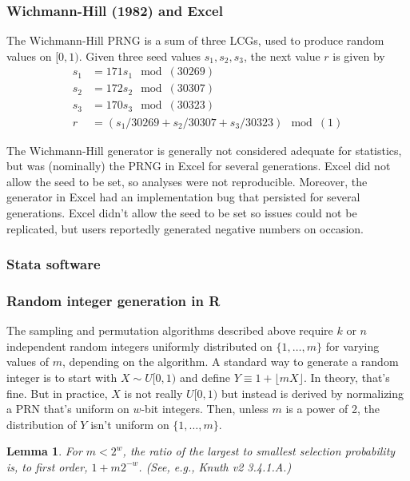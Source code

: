 \documentclass[12pt]{article}
\newtheorem{lemma}[theorem]{Lemma}
\newcommand{\todo}[1]{{\color{red}{TO DO: \sc #1}}}
\begin{document}
\subsubsection{Wichmann-Hill (1982) \todo{cite} and Excel}
The Wichmann-Hill PRNG is a sum of three LCGs, used to produce random values on $[0, 1)$.
Given three seed values $s_1, s_2, s_3$, the next value $r$ is given by
\begin{align*}
s_1 &= 171 s_1\mod(30269) \\
s_2 &= 172 s_2 \mod(30307) \\
s_3 &= 170 s_3 \mod(30323) \\
r &= (s_1/30269 + s_2/30307 + s_3/30323) \mod(1)
\end{align*}

The Wichmann-Hill generator is generally not considered adequate for statistics, but was (nominally) the PRNG in Excel for several generations. 
Excel did not allow the seed to be set, so analyses were not reproducible.
Moreover, the generator in Excel had an implementation bug that persisted for several generations.
Excel didn't allow the seed to be set so issues could not be replicated, but users reportedly generated negative numbers on occasion.
\todo{cite McCullough, B.D., 2008. Microsoft Excel?s ?Not The Wichmann?Hill? random number generators}

\subsubsection{Stata software}
\todo{ summarize results from Ozier: "Perils of Simulation..."}

\subsubsection{Random integer generation in R}
The sampling and permutation algorithms described above require $k$ or $n$ independent random integers
uniformly distributed on $\{1, \dots, m\}$ for varying values of $m$, depending on the algorithm.
A standard way to generate a random integer is to start with $X \sim U[0,1)$ and define $Y \equiv 1 + \lfloor mX \rfloor$. 
In theory, that's fine. 
But in practice, $X$ is not really $U[0,1)$ but instead is derived by normalizing a PRN that's uniform on $w$-bit integers. 
Then, unless $m$ is a power of 2, the distribution of $Y$ isn't uniform on $\{1, \ldots, m\}$. 

\begin{lemma}
For $m < 2^w$, the ratio of the largest to smallest selection probability is, to first order,  $1+ m 2^{-w}$. (See, e.g., Knuth v2 3.4.1.A.)
\end{lemma}
\end{document}
